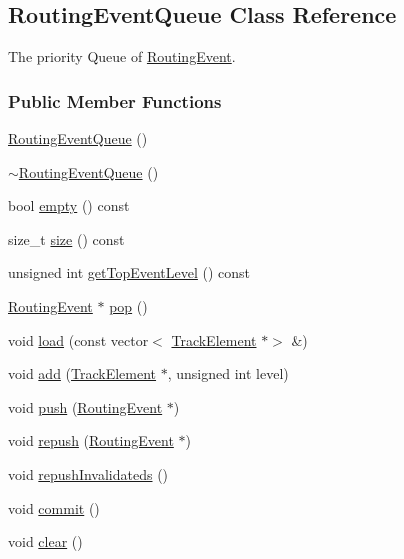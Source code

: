 \hypertarget{classKite_1_1RoutingEventQueue}{}\subsection{Routing\+Event\+Queue Class Reference}
\label{classKite_1_1RoutingEventQueue}


The priority Queue of \mbox{\hyperlink{classKite_1_1RoutingEvent}{Routing\+Event}}.  


\subsubsection*{Public Member Functions}
\begin{DoxyCompactItemize}
\item 
\mbox{\hyperlink{classKite_1_1RoutingEventQueue_a67dd3abe4f9f4f32e91dfaa9573976ca}{Routing\+Event\+Queue}} ()
\item 
\mbox{\hyperlink{classKite_1_1RoutingEventQueue_a28ed9894863ae1029f16744a86d4bfab}{$\sim$\+Routing\+Event\+Queue}} ()
\item 
bool \mbox{\hyperlink{classKite_1_1RoutingEventQueue_a644718bb2fb240de962dc3c9a1fdf0dc}{empty}} () const
\item 
size\+\_\+t \mbox{\hyperlink{classKite_1_1RoutingEventQueue_a259cb5a711406a8c3e5d937eb9350cca}{size}} () const
\item 
unsigned int \mbox{\hyperlink{classKite_1_1RoutingEventQueue_a85befa55ce7e51c7067f4f7cb29acc0a}{get\+Top\+Event\+Level}} () const
\item 
\mbox{\hyperlink{classKite_1_1RoutingEvent}{Routing\+Event}} $\ast$ \mbox{\hyperlink{classKite_1_1RoutingEventQueue_af1b85d0b49565932c55ec55625cd8838}{pop}} ()
\item 
void \mbox{\hyperlink{classKite_1_1RoutingEventQueue_a7f5a051812b2925dc3c1cca8b2011237}{load}} (const vector$<$ \mbox{\hyperlink{classKite_1_1TrackElement}{Track\+Element}} $\ast$$>$ \&)
\item 
void \mbox{\hyperlink{classKite_1_1RoutingEventQueue_af0813b67c9fc72d960f7e512e9403d57}{add}} (\mbox{\hyperlink{classKite_1_1TrackElement}{Track\+Element}} $\ast$, unsigned int level)
\item 
void \mbox{\hyperlink{classKite_1_1RoutingEventQueue_ac802427673567526d06af911e94f7216}{push}} (\mbox{\hyperlink{classKite_1_1RoutingEvent}{Routing\+Event}} $\ast$)
\item 
void \mbox{\hyperlink{classKite_1_1RoutingEventQueue_afd2fa6d6f5d90c472bea9befa97d955d}{repush}} (\mbox{\hyperlink{classKite_1_1RoutingEvent}{Routing\+Event}} $\ast$)
\item 
void \mbox{\hyperlink{classKite_1_1RoutingEventQueue_a4fb0022d3e8f91a862b5f6438b7f8dad}{repush\+Invalidateds}} ()
\item 
void \mbox{\hyperlink{classKite_1_1RoutingEventQueue_ad55316f5135cdae6aa6c5a763f6c3473}{commit}} ()
\item 
void \mbox{\hyperlink{classKite_1_1RoutingEventQueue_ac8bb3912a3ce86b15842e79d0b421204}{clear}} ()
\end{DoxyCompactItemize}


